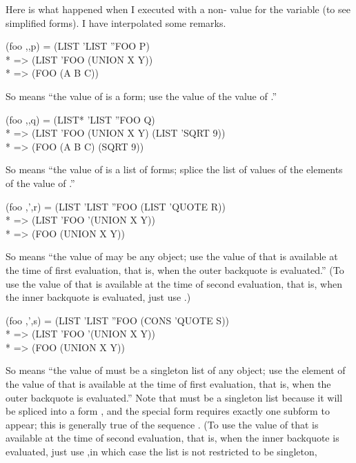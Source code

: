 \begin{new}
Here is what happened when I executed  with
a non- value for the variable  (to see
simplified forms).  I have interpolated some remarks.
\begin{lisp}
{\Xbq}{\Xbq}(foo ,,p) = (LIST 'LIST ''FOO P) \\*
 => (LIST 'FOO (UNION X Y)) \\*
 => (FOO (A B C))
\end{lisp}
So  means ``the value of  is a form;
use the value of the value of .''
\begin{lisp}
{\Xbq}{\Xbq}(foo ,,{\Xatsign}q) = (LIST* 'LIST ''FOO Q) \\*
 => (LIST 'FOO (UNION X Y) (LIST 'SQRT 9)) \\*
 => (FOO (A B C) (SQRT 9))
\end{lisp}
So  means ``the value of  is a list of forms;
splice the list of values of the elements of the value of .''
\begin{lisp}
{\Xbq}{\Xbq}(foo ,',r) = (LIST 'LIST ''FOO (LIST 'QUOTE R)) \\*
 => (LIST 'FOO '(UNION X Y)) \\*
 => (FOO (UNION X Y))
\end{lisp}
So  means ``the value of  may be any object;
use the value of 
that is available at the time of first evaluation,
that is, when the outer backquote is evaluated.''
(To use the value of  that is available at the time of second evaluation,
that is, when the inner backquote is evaluated,
just use .)
\begin{lisp}
{\Xbq}{\Xbq}(foo ,',{\Xatsign}s) = (LIST 'LIST ''FOO (CONS 'QUOTE S)) \\*
 => (LIST 'FOO '(UNION X Y)) \\*
 => (FOO (UNION X Y))
\end{lisp}
So  means ``the value of  must be a singleton list of any object;
use the element of the value of 
that is available at the time of first evaluation,
that is, when the outer backquote is evaluated.''
Note that  must be a singleton list because it will be spliced
into a form , and the  special form requires exactly
one subform to appear; this is generally true of the sequence .
(To use the value of  that is available at the time of second evaluation,
that is, when the inner backquote is evaluated,
just use ,in which case the list  is not restricted to be singleton,

\end{new}
